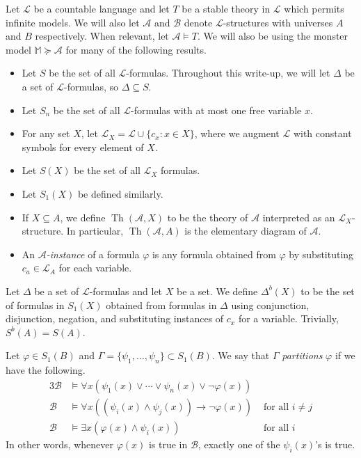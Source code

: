 \documentclass{article}
\newcommand\monster{\mathbb{M}}
\DeclareMathOperator{\Th}{Th}
\let\mc\mathcal
\begin{document}

\begin{notation}[Preliminaries] Let $\mc{L}$ be a countable language and let $T$ be a stable theory in $\mc{L}$ which permits infinite models. We will also let $\mc{A}$ and $\mc{B}$ denote $\mc{L}$-structures with universes $A$ and $B$ respectively. When relevant, let $\mc{A} \vDash T$. We will also be using the monster model $\monster \succeq \mc{A}$ for many of the following results.
    \begin{itemize}
        \item Let $S$ be the set of all $\mc{L}$-formulas. Throughout this write-up, we will let $\Delta$ be a set of $\mc{L}$-formulas, so $\Delta \subseteq S$.
        \item Let $S_n$ be the set of all $\mc{L}$-formulas with at most one free variable $x$.
        \item For any set $X$, let $\mc{L}_X = \mc{L} \cup \{ c_x : x \in X \}$, where we augment $\mc{L}$ with constant symbols for every element of $X$.
        \item Let $S(X)$ be the set of all $\mc{L}_X$ formulas.
        \item Let $S_1(X)$ be defined similarly.
        \item If $X \subseteq A$, we define $\Th(\mc{A}, X)$ to be the theory of $\mc{A}$ interpreted as an $\mc{L}_X$-structure. In particular, $\Th(\mc{A}, A)$ is the elementary diagram of $\mc{A}$.
        \item An \textit{$\mc{A}$-instance} of a formula $\varphi$ is any formula obtained from $\varphi$ by substituting $c_a \in \mc{L}_A$ for each variable.
    \end{itemize}
\end{notation}

\begin{definition}
    Let $\Delta$ be a set of $\mc{L}$-formulas and let $X$ be a set. We define $\Delta^b(X)$ to be the set of formulas in $S_1(X)$ obtained from formulas in $\Delta$ using conjunction, disjunction, negation, and substituting instances of $c_x$ for a variable. Trivially, $S^b(A) = S(A)$.
\end{definition}

\begin{definition}[Partitioning]
   Let $\varphi \in S_1(B)$ and $\Gamma = \{ \psi_1, \ldots, \psi_n \} \subset S_1(B)$. We say that $\Gamma$ \textit{partitions} $\varphi$ if we have the following.
   \begin{alignat*}{3}
        \mc{B} &\vDash \forall x (\psi_1(x) \lor \cdots \lor \psi_n(x) \lor \neg \varphi(x)) \\
        \mc{B} &\vDash \forall x ((\psi_i(x) \land \psi_j(x)) \to \neg \varphi(x)) &\text{ for all } i \neq j \\
        \mc{B} &\vDash \exists x (\varphi(x) \land \psi_i(x)) &\text{ for all } i
   \end{alignat*}
   In other words, whenever $\varphi(x)$ is true in $\mc{B}$, exactly one of the $\psi_i(x)$'s is true.
\end{definition}
\end{document}
